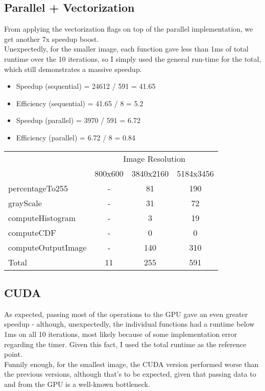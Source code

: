 \documentclass[sigconf]{acmart}
\begin{document}
\subsection{Parallel + Vectorization}

From applying the vectorization flags on top of the parallel implementation, we get another 7x speedup boost.\\

Unexpectedly, for the smaller image, each function gave less than 1ms of total runtime over the 10 iterations, so I simply used the general run-time for the total, which still demonstrates a massive speedup.\\

\begin{itemize}
    \item Speedup (sequential) = 24612 / 591 = 41.65
    \item Efficiency (sequential) = 41.65 / 8 = 5.2
    \item Speedup (parallel) = 3970 / 591 = 6.72
    \item Efficiency (parallel) = 6.72 / 8 = 0.84
\end{itemize}

\begin{table}[H]
\begin{tabular}{|lccc|}
\hline
\multicolumn{1}{|c}{} & \multicolumn{3}{c|}{Image Resolution} \\
                      & 800x600   & 3840x2160   & 5184x3456   \\
percentageTo255       & -         & 81          & 190         \\
grayScale             & -         & 31          & 72          \\
computeHistogram      & -         & 3           & 19          \\
computeCDF            & -         & 0           & 0           \\
computeOutputImage    & -         & 140         & 310         \\
Total                 & 11        & 255         & 591         \\ \hline
\end{tabular}
\end{table}

\subsection{CUDA}

As expected, passing most of the operations to the GPU gave an even greater speedup - although, unexpectedly, the individual functions had a runtime below 1ms on all 10 iterations, most likely because of some implementation error regarding the timer. Given this fact, I used the total runtime as the reference point.\\
Funnily enough, for the smallest image, the CUDA version performed worse than the previous versions, although that's to be expected, given that passing data to and from the GPU is a well-known bottleneck.\\
\end{document}
